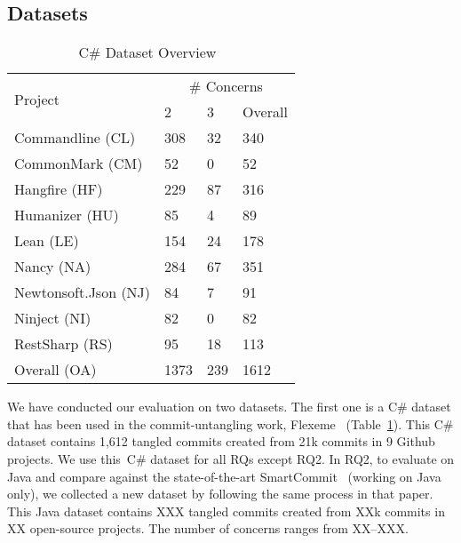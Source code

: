\subsection{Datasets}

\begin{table}[t]
	\caption{C\# Dataset Overview~\cite{flexeme-fse20}}
	\vspace{-0.1in}
	\begin{center}
		\scriptsize
		\tabcolsep 4pt
		\renewcommand{\arraystretch}{1} \begin{tabular}{p{3cm}<{\centering}|p{0.8cm}<{\centering}p{0.8cm}<{\centering}p{0.8cm}<{\centering}}
			
			\hline
			\multirow{2}{*}{Project}                  & \multicolumn{3}{c}{\# Concerns}\\
			\cline{2-4}
			                     & 2 & 3& Overall\\
			\hline
			
			Commandline (CL)        &  308 & 32  &   340        \\
			CommonMark (CM)        &  52 & 0  &   52        \\
			Hangfire (HF)       &  229 & 87  &   316        \\
			Humanizer (HU)        &  85 & 4  &   89        \\
			Lean (LE)        &  154 & 24  &   178        \\
			Nancy (NA)       &  284 & 67  &   351        \\
			Newtonsoft.Json (NJ)        &  84 & 7  &   91        \\
			Ninject (NI)       &  82 & 0  &  82        \\
			RestSharp (RS)       &  95 & 18  &   113        \\
			\hline
			Overall (OA)       &  1373 & 239  &  1612        \\
			\hline
		\end{tabular}
		\label{C-dataset}
	\end{center}
\end{table}

We have conducted our evaluation on two datasets. The first one is a
C\# dataset that has been used in the commit-untangling work,
Flexeme~\cite{flexeme-fse20} (Table~\ref{C-dataset}). This C\# dataset
contains 1,612 tangled commits created from 21k commits in 9 Github
projects. We use this~C\# dataset for all RQs except RQ2. In RQ2, to
evaluate {\tool} on Java and compare against the
state-of-the-art SmartCommit~\cite{smartcommit-fse21} (working on Java
only), we collected a new dataset by following the same process in
that paper. This Java dataset contains XXX tangled commits created
from XXk commits in XX open-source projects. The number of concerns
ranges from XX--XXX.

